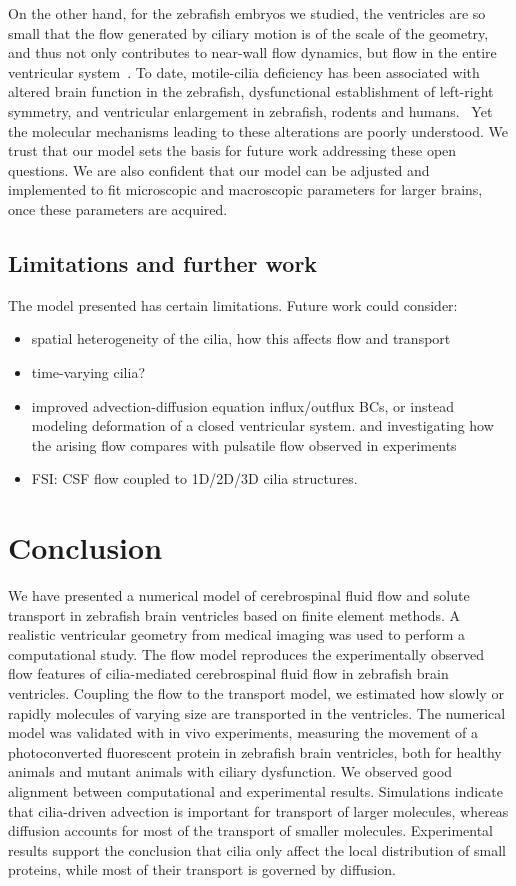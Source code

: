 \documentclass{WileyMSP-template}
\begin{document}
On the other hand, for the zebrafish embryos we studied,
the ventricles are so small that the flow
generated by ciliary motion is of the scale of the geometry, and thus not
only contributes to near-wall flow dynamics, but flow in the entire ventricular
system~\cite{Olstad2019CiliaryDevelopment}.
To date, motile-cilia deficiency has been associated with altered brain function
in the zebrafish, dysfunctional establishment of left-right symmetry,
and ventricular enlargement in zebrafish, rodents and humans.~\cite{Afzelius2004Cilia-relatedDiseases,
Youn2018PrimaryDiseases, Ma2024CiliaDisease, Ibanez-Tallon2002LossHydrocephalus}
Yet the molecular mechanisms leading to these alterations are poorly understood.
We trust that our model sets the basis for future work addressing these open questions.
We are also confident that our model can be adjusted and implemented to fit
microscopic and macroscopic parameters for larger brains, once these parameters are acquired.

\subsection{Limitations and further work}
The model presented has certain limitations. Future work could consider:
\begin{itemize}
    \item spatial heterogeneity of the cilia, how this affects flow and transport
    \item time-varying cilia?
    \item improved advection-diffusion equation influx/outflux BCs, or instead
    modeling deformation of a closed ventricular system. 
    and investigating how the arising flow compares with pulsatile flow observed in experiments
    \item FSI: CSF flow coupled to 1D/2D/3D cilia structures.
\end{itemize}

\section{Conclusion}
We have presented a numerical model
of cerebrospinal fluid flow and solute transport in
zebrafish brain ventricles based on finite element methods.
A realistic ventricular geometry from medical imaging was used to perform a
computational study. The flow model reproduces
the experimentally observed flow features of cilia-mediated cerebrospinal fluid
flow in zebrafish brain ventricles. Coupling the flow to the transport model,
we estimated how slowly or rapidly molecules of varying size are transported in
the ventricles. 
The numerical model was validated with in vivo experiments, measuring the movement of
a photoconverted fluorescent protein in zebrafish brain ventricles,
both for healthy animals and mutant animals with ciliary dysfunction.
We observed good alignment between computational and experimental results.
Simulations indicate that cilia-driven advection is important
for transport of larger molecules, whereas diffusion accounts for most of
the transport of smaller molecules. 
Experimental results support the conclusion that cilia only affect the
local distribution of small proteins,
while most of their transport is governed by diffusion. 
\end{document}
